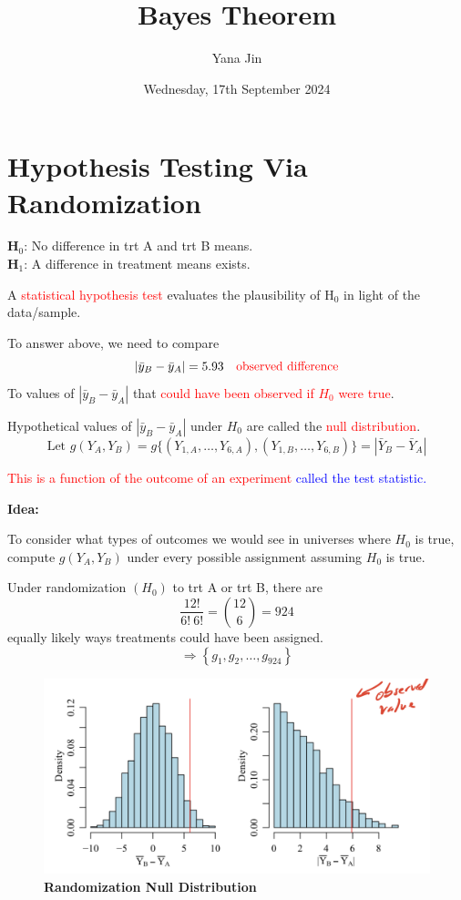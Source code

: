 \documentclass[14pt]{extarticle}
\title{Bayes Theorem}
\author{Yana Jin}
\date{Wednesday, 17th September 2024}
\begin{document}
\section*{Hypothesis Testing Via Randomization}

\textbf{H\(_0\)}: No difference in trt A and trt B means. \\
\textbf{H\(_1\)}: A difference in treatment means exists.

\noindent A \textcolor{red}{statistical hypothesis test} evaluates the plausibility of H\(_0\) in light of the data/sample.

\noindent To answer above, we need to compare
\[
\left| \bar{y}_B - \bar{y}_A \right| = 5.93 \quad \textcolor{red}{\text{observed difference}}
\]
\noindent To values of \( \left| \bar{y}_B - \bar{y}_A \right| \) that \textcolor{red}{could have been observed if \(H_0\) were true}.
\vspace{0.5cm}

\noindent Hypothetical values of \( \left| \bar{y}_B - \bar{y}_A \right| \) under \(H_0\) are called the \textcolor{red}{null distribution}.
\[
\text{Let }
g(Y_A, Y_B) = g\{ \left( Y_{1,A}, \dots, Y_{6,A} \right), \left( Y_{1,B}, \dots, Y_{6,B} \right) \}
= \left| \bar{Y}_B - \bar{Y}_A \right|
\]

\textcolor{red}{This is a function of the outcome of an experiment} \textcolor{blue}{called the test statistic.}

\noindent \textbf{Idea:}

To consider what types of outcomes we would see in universes where \( H_0 \) is true, compute \( g(Y_A, Y_B) \) under every possible assignment assuming \( H_0 \) is true.

Under randomization $(H_0)$ to trt A or trt B, there are
\[
\frac{12!}{6! \ 6!} = \binom{12}{6} = 924
\]
equally likely ways treatments could have been assigned.
\[
\Rightarrow \left\{ g_1, g_2, \dots, g_{924} \right\}
\]
\begin{figure}[h]
    \centering
    \includegraphics[width=1\textwidth]{fig1.png}
    \textbf{Randomization Null Distribution}
\end{figure}
\end{document}
